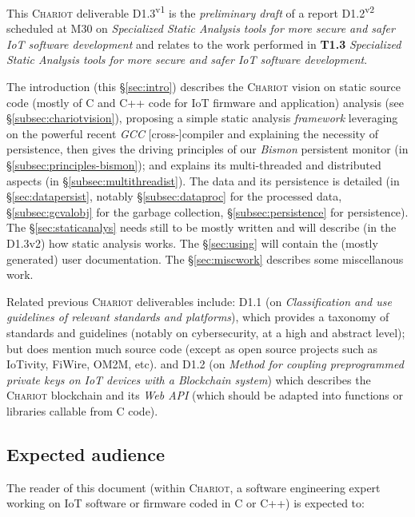 This \textsc{Chariot} deliverable D1.3\textsuperscript{v1} is the
\emph{preliminary draft} of a report D1.2\textsuperscript{v2} scheduled at M30 on
\emph{Specialized Static Analysis tools for more secure and safer IoT
  software development} and relates to the work performed in
\textbf{T1.3} \emph{Specialized Static Analysis tools for more secure
  and safer IoT software development}.

The introduction (this §\ref{sec:intro}) describes the
\textsc{Chariot} vision on static source code (mostly of C and C++
code for IoT firmware and application) analysis (see
§\ref{subsec:chariotvision}), proposing a simple static analysis
\emph{framework} leveraging on the powerful recent \emph{GCC}
     [cross-]compiler and explaining the necessity of persistence,
     then gives the driving principles of our \emph{Bismon} persistent
     monitor (in §\ref{subsec:principles-bismon}); and explains its
     multi-threaded and distributed aspects (in
     §\ref{subsec:multithreadist}). The data and its persistence is
     detailed (in §\ref{sec:datapersist}, notably
     §\ref{subsec:dataproc} for the processed data,
     §\ref{subsec:gcvalobj} for the garbage collection,
     §\ref{subsec:persistence} for persistence).  The
     §\ref{sec:staticanalys} needs still to be mostly written and will
     describe (in the D1.3v2) how static analysis works. The
     §\ref{sec:using} will contain the (mostly generated) user
     documentation. The §\ref{sec:miscwork} describes some
     miscellanous work.


Related previous \textsc{Chariot} deliverables include: D1.1 (on
\emph{Classification and use guidelines of relevant standards and
  platforms}), which provides a taxonomy of standards and guidelines
(notably on cybersecurity, at a high and abstract level); but does
mention much source code (except as open source projects such as
IoTivity, FiWire, OM2M, etc). and D1.2 (on \emph{Method for coupling
  preprogrammed private keys on IoT devices with a Blockchain system})
which describes the \textsc{Chariot} blockchain and its \emph{Web API}
(which should be adapted into functions or libraries callable from C
code).

\subsection{Expected audience}
\label{subsec:audience}

The reader of this document (within \textsc{Chariot}, a software
engineering expert working on IoT software or firmware coded in C or
C++) is expected to:


